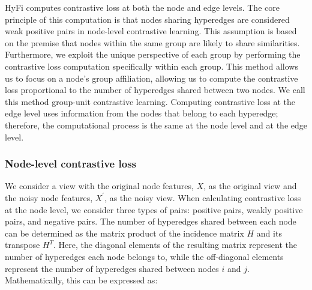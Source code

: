HyFi computes contrastive loss at both the node and edge levels. The core principle of this computation is that nodes sharing hyperedges are considered weak positive pairs in node-level contrastive learning. This assumption is based on the premise that nodes within the same group are likely to share similarities. Furthermore, we exploit the unique perspective of each group by performing the contrastive loss computation specifically within each group. This method allows us to focus on a node's group affiliation, allowing us to compute the contrastive loss proportional to the number of hyperedges shared between two nodes. We call this method group-unit contrastive learning. Computing contrastive loss at the edge level uses information from the nodes that belong to each hyperedge; therefore, the computational process is the same at the node level and at the edge level.



\subsubsection{Node-level contrastive loss}

We consider a view with the original node features, \(X\), as the original view and the noisy node features, \(X^{\prime}\), as the noisy view. When calculating contrastive loss at the node level, we consider three types of pairs: positive pairs, weakly positive pairs, and negative pairs. The number of hyperedges shared between each node can be determined as the matrix product of the incidence matrix \(H\) and its transpose \(H^T\). Here, the diagonal elements of the resulting matrix represent the number of hyperedges each node belongs to, while the off-diagonal elements represent the number of hyperedges shared between nodes \(i\) and \(j\). Mathematically, this can be expressed as:

